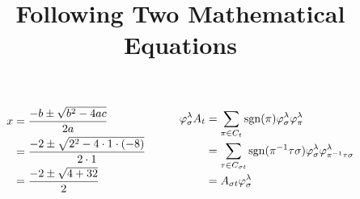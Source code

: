 \documentclass{article}
\begin{document}
	
	\title{Following Two Mathematical Equations}
	\date{}
	\maketitle
	
	\[
	\begin{aligned}
		x &= \frac{-b \pm \sqrt{b^2 - 4ac}}{2a} \\
		&= \frac{-2 \pm \sqrt{2^2 - 4 \cdot 1 \cdot (-8)}}{2 \cdot 1} \\
		&= \frac{-2 \pm \sqrt{4 + 32}}{2}
	\end{aligned}
	\quad \quad \quad
	\begin{aligned}
		\varphi_{\sigma}^{\lambda} A_{t} &= \sum_{\pi \in C_{t}} \operatorname{sgn}(\pi) \varphi_{\sigma}^{\lambda} \varphi_{\pi}^{\lambda} \notag \\
		&= \sum_{\tau \in C_{\sigma t}} \operatorname{sgn}(\pi^{-1} \tau \sigma) \varphi_{\sigma}^{\lambda} \varphi_{\pi^{-1} \tau \sigma}^{\lambda} \notag \\
		&= A_{\sigma t} \varphi_{\sigma}^{\lambda}
	\end{aligned}
	\]
	
\end{document}
